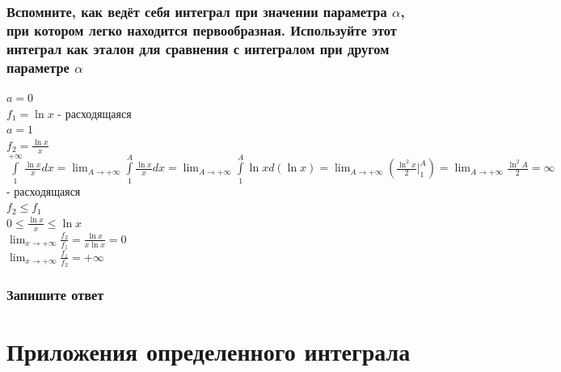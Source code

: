 \documentclass{article}
\begin{document}
\subsubsection{Вспомните, как ведёт себя интеграл при значении параметра $ \alpha $, при котором легко находится первообразная. Используйте этот интеграл как эталон для сравнения с интегралом при другом параметре $ \alpha $}
$ a = 0 $\\
$ f_1 = \ln{x} $ - расходящаяся\\
$ a = 1 $\\
$ f_2 = \frac{\ln{x}}{x} $\\
$ \int\limits^{+\infty}_1 \frac{\ln{x}}{x}dx = \lim_{A\to +\infty} \int\limits^A_1 \frac{\ln{x}}{x}dx = \lim_{A\to +\infty} \int\limits^A_1 \ln{x}d(\ln{x}) = \lim_{A\to +\infty} (\frac{\ln^2{x}}{2} |^A_1) = \lim_{A\to +\infty} \frac{\ln^2{A}}{2} = \infty $ - расходящаяся\\
$ f_2 \le f_1 $\\
$ 0 \le \frac{\ln{x}}{x} \le \ln{x} $\\
$ \lim_{x\to +\infty} \frac{f_2}{f_1} = \frac{\ln{x}}{x\ln{x}} = 0 $\\
$ \lim_{x\to +\infty} \frac{f_1}{f_2} = +\infty $
\subsubsection{Запишите ответ}
\newpage
\Large
\section{Приложения определенного интеграла}
\normalsize
\end{document}
